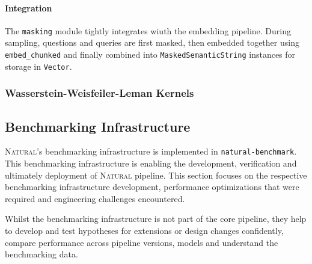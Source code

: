 
\paragraph{Integration}

The \texttt{masking} module tightly integrates wiuth the embedding pipeline.
During sampling, questions and queries are first masked, then embedded together
using \texttt{embed\_chunked} and finally combined into
\texttt{MaskedSemanticString} instances for storage in \texttt{Vector}.

\subsubsection{Wasserstein-Weisfeiler-Leman Kernels}


\subsection{Benchmarking Infrastructure}

\textsc{Natural}'s benchmarking infrastructure is implemented in
\texttt{natural-benchmark}. This benchmarking infrastructure is enabling the
development, verification and ultimately deployment of \textsc{Natural}
pipeline. This section focuses on the respective benchmarking infrastructure
development, performance optimizations that were required and engineering
challenges encountered. 

Whilst the benchmarking infrastructure is not part of the core pipeline, they
help to develop and test hypotheses for extensions or design changes
confidently, compare performance across pipeline versions, models and
understand the benchmarking data.

